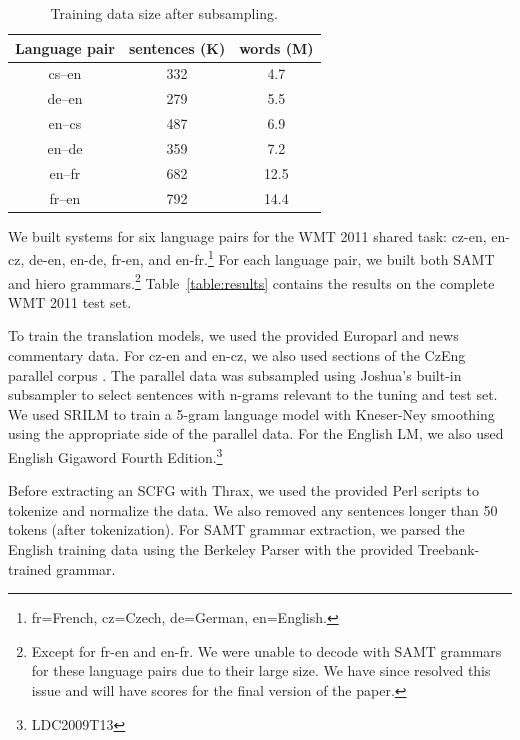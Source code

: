 \documentclass[11pt]{article}
\begin{document}
\begin{table}
\centering
\begin{tabular}{|c|c|c|}
Language pair & sentences (K) & words (M) \\
\hline\hline
cs--en & 332 & 4.7 \\
de--en & 279 & 5.5 \\
en--cs & 487 & 6.9 \\
en--de & 359 & 7.2 \\
en--fr & 682 & 12.5 \\
fr--en & 792 & 14.4 \\
\end{tabular}
\caption{Training data size after subsampling.\label{training-data-size}}
\end{table}

We built systems for six language pairs for the WMT 2011 shared task:
cz-en, en-cz, de-en, en-de, fr-en, and en-fr.\footnote{fr=French,
  cz=Czech, de=German, en=English.}  For each language pair,
we built both SAMT and hiero grammars.\footnote{Except for fr-en and
  en-fr.  We were unable to decode with SAMT grammars for these
  language pairs due to their large size.  We have since resolved this
  issue and will have scores for the final version of the paper.}
Table~\ref{table:results} contains the results on the complete WMT
2011 test set.

To train the translation models, we used the provided Europarl and
news commentary data. For cz-en and en-cz, we also used sections of
the CzEng parallel corpus \cite{czeng:pbml:2009}.  The parallel data
was subsampled using Joshua's built-in subsampler to select sentences
with n-grams relevant to the tuning and test set.  We used SRILM to train a 5-gram language model with Kneser-Ney smoothing using the appropriate side of the parallel data. For the English LM, we also used English Gigaword Fourth Edition.\footnote{LDC2009T13}

Before extracting an SCFG with Thrax, we used the provided Perl
scripts to tokenize and normalize the data. We also removed any
sentences longer than 50 tokens (after tokenization).  For SAMT
grammar extraction, 
we parsed the English training data using the Berkeley Parser
\cite{petrov2006learning} with the
provided Treebank-trained grammar.
\end{document}
